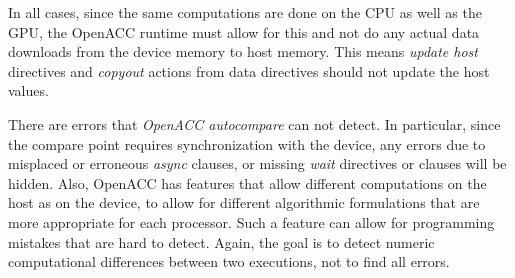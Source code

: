 In all cases, since the same computations are done on the CPU as well as the GPU, the OpenACC runtime must allow for this and not do any actual data downloads from the device memory to host memory.
This means \emph{update host} directives and \emph{copyout} actions from data directives should not update the host values.

There are errors that \emph{OpenACC autocompare} can not detect.
In particular, since the compare point requires synchronization with the device, any errors due to misplaced or erroneous \emph{async} clauses, or missing \emph{wait} directives or clauses will be hidden.
Also, OpenACC has features that allow different computations on the host as on the device, to allow for different algorithmic formulations that are more appropriate for each processor.
Such a feature can allow for programming mistakes that are hard to detect.
Again, the goal is to detect numeric computational differences between two executions, not to find all errors.
